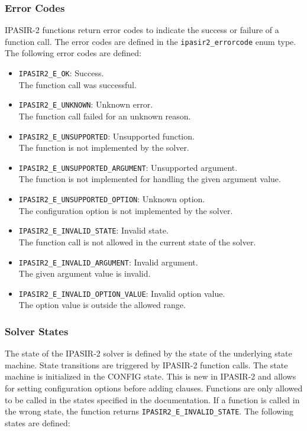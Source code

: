 \documentclass[sat]{iosart2x}
\begin{document}
\subsubsection{Error Codes}

IPASIR-2 functions return error codes to indicate the success or failure of a function call.
The error codes are defined in the \texttt{ipasir2\_errorcode} enum type.
The following error codes are defined:

\begin{itemize}
    \item \texttt{IPASIR2\_E\_OK}: Success.\\
    The function call was successful.
    \item \texttt{IPASIR2\_E\_UNKNOWN}: Unknown error.\\
    The function call failed for an unknown reason.
    \item \texttt{IPASIR2\_E\_UNSUPPORTED}: Unsupported function.\\
    The function is not implemented by the solver.
    \item \texttt{IPASIR2\_E\_UNSUPPORTED\_ARGUMENT}: Unsupported argument.\\
    The function is not implemented for handling the given argument value.
    \item \texttt{IPASIR2\_E\_UNSUPPORTED\_OPTION}: Unknown option.\\
    The configuration option is not implemented by the solver.
    \item \texttt{IPASIR2\_E\_INVALID\_STATE}: Invalid state.\\
    The function call is not allowed in the current state of the solver.
    \item \texttt{IPASIR2\_E\_INVALID\_ARGUMENT}: Invalid argument.\\
    The given argument value is invalid.
    \item \texttt{IPASIR2\_E\_INVALID\_OPTION\_VALUE}: Invalid option value.\\
    The option value is outside the allowed range.
\end{itemize}

\subsubsection{Solver States}

The state of the IPASIR-2 solver is defined by the state of the underlying state machine.
State transitions are triggered by IPASIR-2 function calls.
The state machine is initialized in the CONFIG state.
This is new in IPASIR-2 and allows for setting configuration options before adding clauses.
Functions are only allowed to be called in the states specified in the documentation.
If a function is called in the wrong state, the function returns \texttt{IPASIR2\_E\_INVALID\_STATE}.
The following states are defined:
\end{document}
